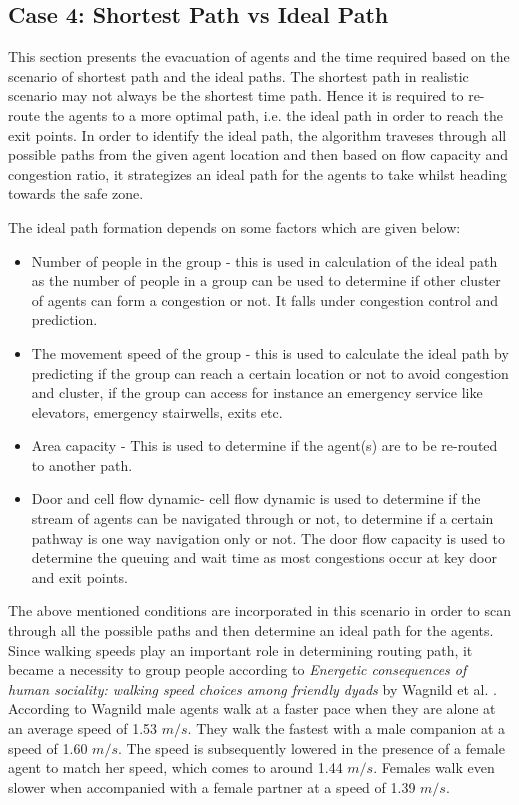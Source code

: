 \subsection{Case 4: Shortest Path vs Ideal Path}
\label{sec: Case 4: Shortest Path vs Ideal Path}

This section presents the evacuation of agents and the time required based on the scenario of shortest path and the ideal paths. The shortest path in realistic scenario may not always be the shortest time path. Hence it is required to re-route the agents to a more optimal path, i.e. the ideal path in order to reach the exit points. In order to identify the ideal path, the algorithm traveses through all possible paths from the given agent location and then based on flow capacity and congestion ratio, it strategizes an ideal path for the agents to take whilst heading towards the safe zone. 

The ideal path formation depends on some factors which are given below:

\begin{itemize}
  \item Number of people in the group - this is used in calculation of the ideal path as the number of people in a group can be used to determine if other cluster of agents can form a congestion or not. It falls under congestion control and prediction.
  \item The movement speed of the group - this is used to calculate the ideal path by predicting if the group can reach a certain location or not to avoid congestion and cluster, if the group can access for instance an emergency service like elevators, emergency stairwells, exits etc.
  \item Area capacity - This is used to determine if the agent(s) are to be re-routed to another path.
  \item Door and cell flow dynamic- cell flow dynamic is used to determine if the stream of agents can be navigated through or not, to determine if a certain pathway is one way navigation only or not. The door flow capacity is used to determine the queuing and wait time as most congestions occur at key door and exit points. 
\end{itemize}

The above mentioned conditions are incorporated in this scenario in order to scan through all the possible paths and then determine an ideal path for the agents. Since walking speeds play an important role in determining routing path, it became a necessity to group people according to \textit{Energetic consequences of human sociality: walking speed choices among friendly dyads} by Wagnild et al. \cite{ref24}. According to Wagnild male agents walk at a faster pace when they are alone at an average speed of 1.53 $m/s$. They walk the fastest with a male companion at a speed of 1.60 $m/s$. The speed is subsequently lowered in the presence of a female agent to match her speed, which comes to around 1.44 $m/s$. Females walk even slower when accompanied with a female partner at a speed of 1.39 $m/s$. 

